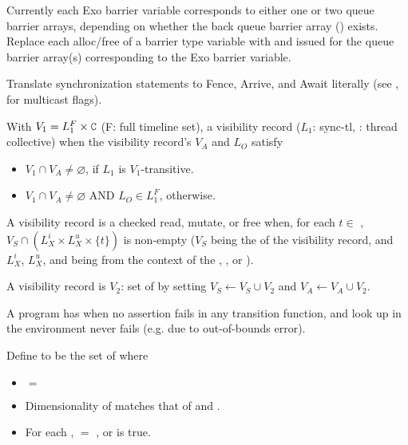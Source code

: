 \filbreak
{} Currently each Exo barrier variable corresponds to either one or two queue barrier arrays, depending on whether the back queue barrier array () exists.
Replace each alloc/free of a barrier type variable with  and  issued for the queue barrier array(s) corresponding to the Exo barrier variable.

\filbreak
Translate synchronization statements to Fence, Arrive, and Await literally (see , for multicast flags).

\filbreak
{}

With $V_1 = L_1^F \times \lighttt{C}$ (F: full timeline set), a visibility record  ($L_1$: sync-tl, : thread collective) when the visibility record's $V_A$ and $L_O$ satisfy
\begin{itemize}
  \item $V_1 \cap V_A \ne \varnothing$, if $L_1$ is $V_1$-transitive.
  \filbreak
  \item $V_1 \cap V_A \ne \varnothing$ AND $L_O \in L_1^F$, otherwise.
\end{itemize}

\filbreak
A visibility record is  a checked read, mutate, or free when, for each $t \in$ , $V_S \cap (L_X^i \times L_X^u \times \{ t \})$ is non-empty ($V_S$ being the  of the visibility record, and $L_X^i$, $L_X^u$, and  being from the context of the , , or ).

\filbreak
A visibility record is  $V_2$: set of  by setting $V_S \leftarrow V_S \cup V_2$ and $V_A \leftarrow V_A \cup V_2$.

\filbreak
A program has  when no assertion fails in any transition function, and look up in the environment never fails (e.g. due to out-of-bounds error).

\filbreak
Define  to be the set of  where
\begin{itemize}
  \item {} $=$ 
  \filbreak
  \item Dimensionality of  matches that of  and .
  \filbreak
  \item For each ,  $=$ , or  is true.
\end{itemize}

